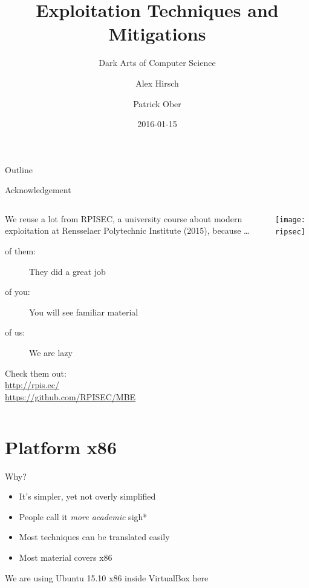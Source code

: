 \documentclass[beamer]{uibk}
\title{Exploitation Techniques and Mitigations}
\subtitle{Dark Arts of Computer Science}
\author{Alex Hirsch \and Patrick Ober}
\date{2016-01-15}
\begin{document}
\maketitle

\begin{frame}{Outline}
    \begin{multicols}{2}
        \tableofcontents
    \end{multicols}
\end{frame}

\begin{frame}{Acknowledgement}
    \begin{columns}
        \begin{column}{0.5\textwidth}
            We reuse a lot from RPISEC, a university course about modern
            exploitation at Rensselaer Polytechnic Institute (2015), because
            \dots

            \begin{description}
                \item[of them:] They did a great job
                \item[of you:] You will see familiar material
                \item[of us:] We are lazy
            \end{description}

            Check them out:\\
            \url{http://rpis.ec/}\\
            \url{https://github.com/RPISEC/MBE}
        \end{column}
        \begin{column}{0.5\textwidth}
            \texttt{[image: ripsec]}
        \end{column}
    \end{columns}
\end{frame}

\section{Platform x86}

\begin{frame}{Why?}
    \begin{itemize}
        \item It's simpler, yet not overly simplified
        \item People call it \emph{more academic} \quad *sigh*
        \item Most techniques can be translated easily
        \item Most material covers x86
    \end{itemize}
    \bigskip
    We are using Ubuntu 15.10 x86 inside VirtualBox here
\end{frame}
\end{document}

